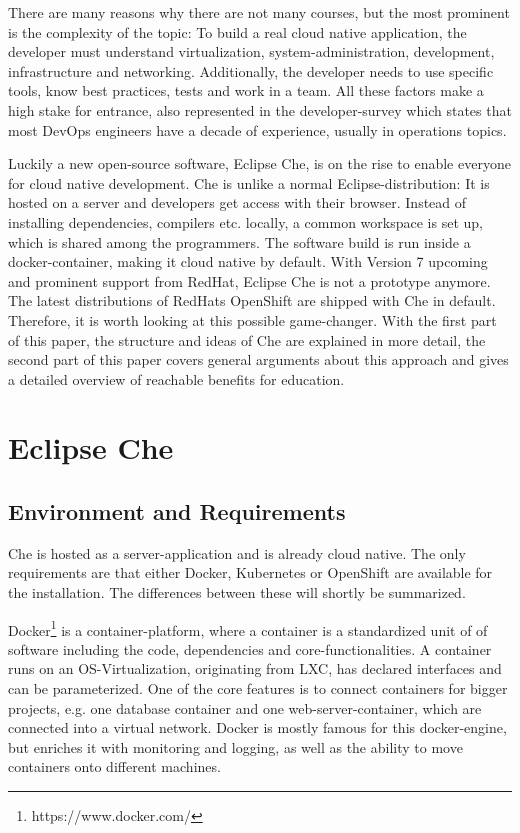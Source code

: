 \documentclass[utf8]{lni}
\begin{document}
There are many reasons why there are not many courses, but the most prominent is the complexity of the topic: 
To build a real cloud native application, the developer must understand virtualization, system-administration, development, 
infrastructure  and  networking. 
Additionally, the developer needs to use specific tools, know best practices, tests and work in a team.
All these factors make a high stake for entrance, also  represented in the developer-survey \cite{SO19} which states that most DevOps engineers have a decade of experience, usually in operations topics.

Luckily a new open-source software, Eclipse Che, is on the rise to enable everyone for cloud native development.
Che is unlike a normal Eclipse-distribution: 
It is hosted on a server and developers get access with their browser. 
Instead of installing dependencies, compilers etc. locally, a common workspace is set up, which is shared among the programmers. 
The software build is run inside a docker-container, making it cloud native by default. 
With Version 7 upcoming and prominent support from RedHat, Eclipse Che is not a prototype anymore. 
The latest distributions of RedHats OpenShift are shipped with Che in default. 
Therefore, it is worth looking at this possible game-changer. 
With the first part of this paper, the structure and ideas of Che are explained in more detail, the second part of this paper covers general arguments about this approach and gives a detailed overview of reachable benefits for education.    

\section{Eclipse Che}
\label{sec:Che}
\subsection{Environment and Requirements}
\label{subsec:Req}
Che is hosted as a server-application and is already cloud native. 
The only requirements are that either Docker, Kubernetes or OpenShift are available for the installation.
The differences between these will shortly be summarized.
 
Docker\footnote{https://www.docker.com/} is a container-platform, where a container is a standardized unit of of software including the code, dependencies and core-functionalities. 
A container runs on an OS-Virtualization, originating from LXC, has declared interfaces and can be parameterized. 
One of the core features is to connect containers for bigger projects, e.g. one 
database container and one web-server-container, which are connected into a virtual network. 
Docker is mostly famous for this docker-engine, but enriches it with monitoring and logging, as well as the ability to move containers onto different machines.   
\end{document}
